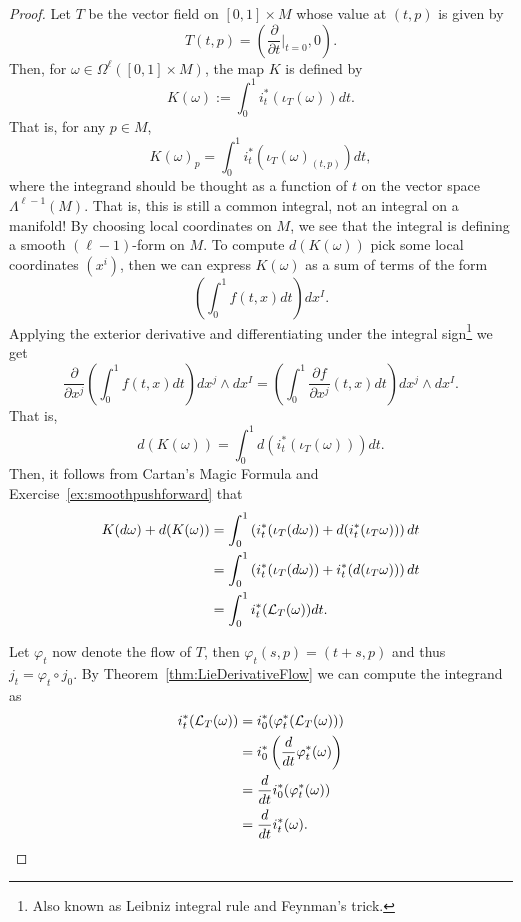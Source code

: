 \begin{proof}
  Let $T$ be the vector field on $[0,1]\times M$ whose value at $(t,p)$ is given by
  \begin{equation}
    T(t,p) = \left(\frac{\partial}{\partial t}\Big|_{t=0}, 0\right).
  \end{equation}
  Then, for $\omega\in\Omega^\ell([0,1]\times M)$, the map $K$ is defined by
  \begin{equation}
    K(\omega) := \int_0^1 i^*_t(\iota_T(\omega)) dt.
  \end{equation}
  That is, for any $p\in M$,
  \begin{equation}
    K(\omega)_p = \int_0^1 i_t^*(\iota_T(\omega)_{(t,p)})dt,
  \end{equation}
  where the integrand should be thought as a function of $t$ on the vector space $\Lambda^{\ell-1}(M)$.
  That is, this is still a common integral, not an integral on a manifold!
  By choosing local coordinates on $M$, we see that the integral is defining a smooth $(\ell-1)$-form on $M$.
  To compute $d(K(\omega))$ pick some local coordinates $(x^i)$, then we can express $K(\omega)$ as a sum of terms of the form
  \begin{equation}
    \left(\int_0^1 f(t,x) dt\right)dx^I.
  \end{equation}
  Applying the exterior derivative and differentiating under the integral sign\footnote{Also known as Leibniz integral rule and Feynman's trick.} we get
  \begin{equation}
    \frac{\partial}{\partial x^j}\left(\int_0^1 f(t,x) dt\right)dx^j\wedge dx^I = \left(\int_0^1 \frac{\partial f}{\partial x^j}(t,x) dt\right)dx^j\wedge dx^I.
  \end{equation}
  That is,
  \begin{equation}
    d(K(\omega)) = \int_0^1 d(i_t^*(\iota_T(\omega)))dt.
  \end{equation}
  Then, it follows from Cartan's Magic Formula and Exercise~\ref{ex:smoothpushforward} that
  \begin{align}
  K(d\omega) + d(K(\omega))
  &= \int_0^1\left( i_t^*(\iota_T(d\omega)) + d (i_t^*(\iota_T\omega)) \right) dt \\
  &= \int_0^1\left( i_t^*(\iota_T(d\omega)) + i_t^* (d(\iota_T\omega)) \right) dt \\ 
  &= \int_0^1 i_t^*(\mathcal{L}_T(\omega)) dt.
  \end{align}

  Let $\varphi_t$ now denote the flow of $T$, then $\varphi_t(s, p) = (t+s, p)$ and thus $j_t = \varphi_t \circ j_0$.
  By Theorem~\ref{thm:LieDerivativeFlow} we can compute the integrand as
  \begin{align}
    i_t^*(\mathcal{L}_T(\omega)) &= i^*_0(\varphi_t^*(\mathcal{L}_T(\omega))) \\
    &= i_0^*\left(\frac{d}{dt} \varphi_t^*(\omega)\right) \\
    &= \frac{d}{dt} i_0^*(\varphi_t^*(\omega)) \\
    &= \frac{d}{dt} i_t^*(\omega).
  \end{align}


\end{proof}
